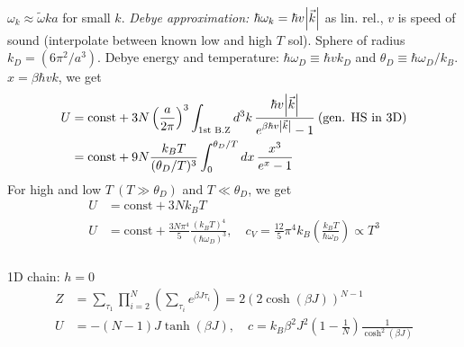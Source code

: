 \documentclass[a4paper, english, 12pt]{article}
\newcommand{\closed}[1]{\left( #1 \right)}
\begin{document}
\begin{multicols*}{2}
$\omega_k\approx \tilde{\omega} ka$ for small $k$. \textit{Debye approximation:} $\hbar\omega_k=\hbar v \abs{\vec{k}}$ as lin. rel., $v$ is speed of sound (interpolate between known low and high $T$ sol). Sphere of radius $k_D=(6\pi^2/a^3)$. Debye energy and temperature: $\hbar \omega_D\equiv \hbar v k_D$ and $\theta_D\equiv \hbar \omega_D/k_B$. $x=\beta\hbar v k$, we get 
\begin{align*}
    U &= \text{const} + 3N\closed{\frac{a}{2\pi}}^3 \int_{\text{1st B.Z}} d^3 k\,\frac{\hbar v \abs{\vec{k}}}{e^{\beta\hbar v \abs{\vec{k}}} - 1}\:(\text{gen. HS in 3D}) \\ 
    &= \text{const} + 9N \frac{k_B T}{(\theta_D / T)^3} \int_0^{\theta_D / T} dx\, \frac{x^3}{e^x - 1}
\end{align*}
For high and low $T\:(T\gg\theta_D)$ and $T\ll\theta_D$, we get   
\begin{align*}
    U & = \text{const} + 3N k_B T \\
    U & = \text{const} + \frac{3N\pi^4}{5} \frac{(k_B T)^4}{(\hbar\omega_D)^3},\quad c_V = \frac{12}{5}\pi^4 k_B \closed{\frac{k_B T}{\hbar\omega_D}} \propto T^3 
\end{align*}


\subsubsection*{}
1D chain: $h=0$
\begin{align*}
    Z &= \sum_{\tau_1} \prod_{i=2}^N \closed{\sum_{\tau_i} e^{\beta J \tau_i}} = 2(2\cosh(\beta J))^{N-1} \\ 
    U &= -(N-1)J\tanh(\beta J),\quad c = k_B \beta^2 J^2 \closed{1-\frac{1}{N}} \frac{1}{\cosh^2(\beta J)}
\end{align*} 



\end{multicols*}
\end{document}
